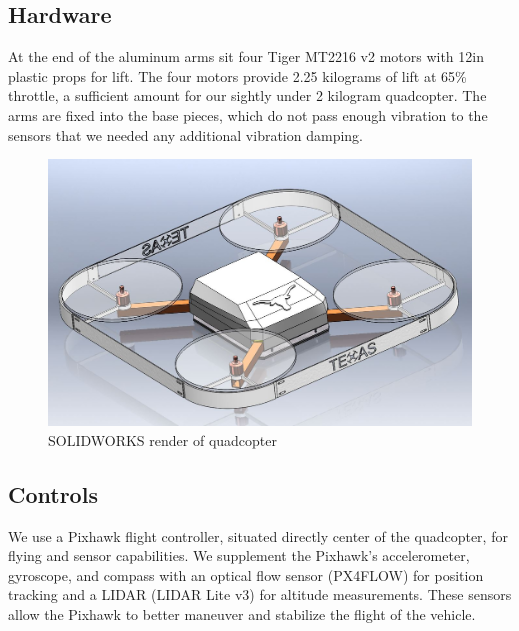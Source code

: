 \documentclass[12pt]{article}
\begin{document}
\subsection{Hardware} 
At the end of the aluminum arms sit four Tiger MT2216 v2 motors with 12in plastic props for lift. The four motors provide 2.25 kilograms of lift at 65\% throttle, a sufficient amount for our sightly under 2 kilogram quadcopter. The arms are fixed into the base pieces, which do not pass enough vibration to the sensors that we needed any additional vibration damping. 

\begin{figure}[!htbp]
\begin{center}
\includegraphics[width=1\textwidth]{render}
\caption*{SOLIDWORKS render of quadcopter}
\end{center}
\end{figure}
\subsection{Controls}
We use a Pixhawk flight controller, situated directly center of the quadcopter, for flying and sensor capabilities. We supplement the Pixhawk's accelerometer, gyroscope, and compass with an optical flow sensor (PX4FLOW) for position tracking and a LIDAR (LIDAR Lite v3) for altitude measurements. These sensors allow the Pixhawk to better maneuver and stabilize the flight of the vehicle. 
\end{document}
